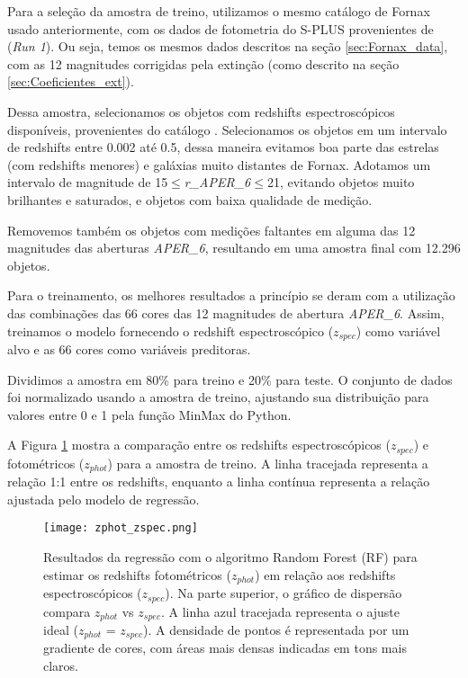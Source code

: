 Para a seleção da amostra de treino, utilizamos o mesmo catálogo de Fornax usado anteriormente, com os dados de fotometria do S-PLUS provenientes de \cite{haack2024splusfornaxprojectsfp} (\textit{Run 1}). Ou seja, temos os mesmos dados descritos na seção \ref{sec:Fornax_data}, com as 12 magnitudes corrigidas pela extinção (como descrito na seção \ref{sec:Coeficientes_ext}).

Dessa amostra, selecionamos os objetos com redshifts espectroscópicos disponíveis, provenientes do catálogo \cite{Lima_2024}. Selecionamos os objetos em um intervalo de redshifts entre 0.002 até 0.5, dessa maneira evitamos boa parte das estrelas (com redshifts menores) e galáxias muito distantes de Fornax. Adotamos um intervalo de magnitude de 15$\leq$\textit{r\_APER\_6}$\leq$21, evitando objetos muito brilhantes e saturados, e objetos com baixa qualidade de medição.

Removemos também os objetos com medições faltantes em alguma das 12 magnitudes das aberturas \textit{APER\_6}, resultando em uma amostra final com 12.296 objetos.

Para o treinamento, os melhores resultados a princípio se deram com a utilização das combinações das 66 cores das 12 magnitudes de abertura \textit{APER\_6}. Assim, treinamos o modelo fornecendo o redshift espectroscópico (\textit{$z_{spec}$}) como variável alvo e as 66 cores como variáveis preditoras.

Dividimos a amostra em 80\% para treino e 20\% para teste. O conjunto de dados foi normalizado usando a amostra de treino, ajustando sua distribuição para valores entre 0 e 1 pela função MinMax do Python. 

A Figura \ref{zphot_zspec} mostra a comparação entre os redshifts espectroscópicos (\textit{$z_{spec}$}) e fotométricos (\textit{$z_{phot}$}) para a amostra de treino. A linha tracejada representa a relação 1:1 entre os redshifts, enquanto a linha contínua representa a relação ajustada pelo modelo de regressão.

\begin{figure}[!ht]
    \centering
    \texttt{[image: zphot\_zspec.png]}
    \caption[]{Resultados da regressão com o algoritmo Random Forest (RF) para estimar os redshifts fotométricos (\textit{$z_{phot}$}) em relação aos redshifts espectroscópicos (\textit{$z_{spec}$}). Na parte superior, o gráfico de dispersão compara \textit{$z_{phot}$} vs \textit{$z_{spec}$}. A linha azul tracejada representa o ajuste ideal (\textit{$z_{phot}$} = \textit{$z_{spec}$}). A densidade de pontos é representada por um gradiente de cores, com áreas mais densas indicadas em tons mais claros.}
    \label{zphot_zspec}
\end{figure}

